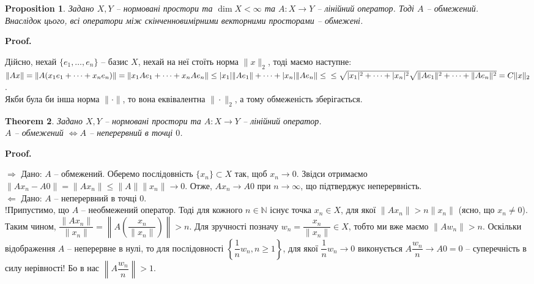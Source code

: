 \documentclass[a4paper, 10pt]{article}
\makeatletter
\def\rightproof{$\boxed{\Rightarrow}$ }
\def\leftproof{$\boxed{\Leftarrow}$ }
\theoremstyle{theoremdd}
\newtheorem{theorem}{Theorem}[subsection]
\theoremstyle{theoremdd}
\theoremstyle{theoremdd}
\theoremstyle{theoremdd}
\theoremstyle{theoremdd}
\newtheorem{proposition}[theorem]{Proposition}
\theoremstyle{theoremdd}
\theoremstyle{theoremdd}
\theoremstyle{theoremdd}
\renewenvironment{proof}[1][Proof.\\]{\par
\pushQED{\hfill \qed}%
\normalfont \topsep6\p@\@plus6\p@\relax
\trivlist
\item\relax
{\bfseries
#1\@addpunct{.}}\hspace\labelsep\ignorespaces
}{%
\popQED\endtrivlist\@endpefalse
}
\makeatother
\begin{document}
\begin{proposition}
Задано $X,Y$ -- нормовані простори та $\dim X < \infty$ та $A \colon X \to Y$ -- лінійний оператор. Тоді $A$ -- обмежений.\\
Внаслідок цього, всі оператори між скінченновимірними векторними просторами -- обмежені.
\end{proposition}

\begin{proof}
Дійсно, нехай $\{e_1,\dots,e_n\}$ -- базис $X$, нехай на неї стоїть норма $\|x\|_2$, тоді маємо наступне:\\
$\|Ax\| = \|A (x_1 e_1 + \dots + x_n e_n) \| = \| x_1 A e_1 + \dots + x_n A e_n \| \leq |x_1| \|A e_1 \| + \dots + |x_n| \|A e_n \| \leq \\
\leq \sqrt{|x_1|^2 + \dots + |x_n|^2} \sqrt{\|Ae_1\|^2 + \dots + \|Ae_n\|^2} = C \|x\|_2$.\\
Якби була би інша норма $\| \cdot \|$, то вона еквівалентна $\| \cdot \|_2$, а тому обмеженість зберігається.
\end{proof}

\begin{theorem}
Задано $X,Y$ -- нормовані простори та $A \colon X \to Y$ -- лінійний оператор.\\
$A$ -- обмежений $\iff A $ -- неперервний в точці $0$.
\end{theorem}

\begin{proof}
\rightproof Дано: $A$ -- обмежений. Оберемо послідовність $\{x_n\} \subset X$ так, щоб $x_n \to 0$. Звідси отримаємо $\|Ax_n - A0\| = \|Ax_n\| \leq \|A\| \|x_n\| \to 0$. Отже, $Ax_n \to A0$ при $n \to \infty$, що підтверджує неперервність. 
\bigskip \\
\leftproof Дано: $A$ -- неперервний в точці $0$.\\
!Припустимо, що $A$ -- необмежений оператор. Тоді для кожного $n \in \mathbb{N}$ існує точка $x_n \in X$, для якої $\|Ax_n\| > n \|x_n\|$ (ясно, що $x_n \neq 0$).  Таким чином, $\dfrac{\|Ax_n\|}{\|x_n\|} = \left\| A\left( \dfrac{x_n}{\|x_n\|} \right) \right\| > n$. Для зручності позначу $w_n = \dfrac{x_n}{\|x_n\|} \in X$, тобто ми вже маємо $\| Aw_n\| > n$. Оскільки відображення $A$ -- неперервне в нулі, то для послідовності $\left\{ \dfrac{1}{n}w_n, n \geq 1 \right\}$, для якої $\dfrac{1}{n} w_n \to 0$ виконується $A \dfrac{w_n}{n} \to A0 = 0$ -- суперечність в силу нерівності! Бо в нас $\left\| A \dfrac{w_n}{n} \right\| > 1$.
\end{proof}
\end{document}
